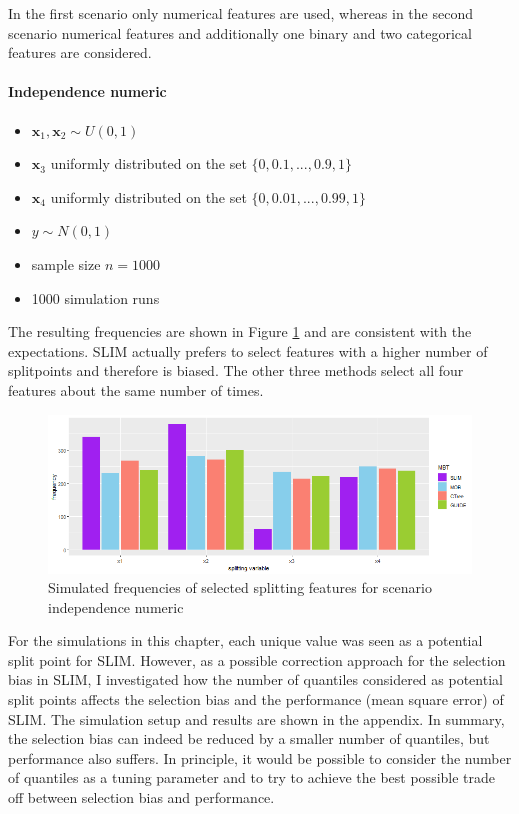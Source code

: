 In the first scenario only numerical features are used, whereas in the second scenario numerical features and additionally one binary and two categorical features are considered.

\paragraph{Independence numeric}
\begin{itemize}
    \item $\textbf{x}_{1}, \textbf{x}_{2} \sim U(0,1)$
    \item $\textbf{x}_3$ uniformly distributed on the set $\{0, 0.1,..., 0.9, 1\}$
    \item $\textbf{x}_4$ uniformly distributed on the set $\{0, 0.01,..., 0.99, 1\}$
    \item $y \sim N(0,1)$
    \item sample size $n = 1000$
    \item 1000 simulation runs
\end{itemize}

The resulting frequencies are shown in Figure \ref{fig:selection_bias_independence_numeric} and are consistent with the expectations. SLIM actually prefers to select features with a higher number of splitpoints and therefore is biased. The other three methods select all four features about the same number of times.

\begin{figure}[!htb]
    \centering
    \includegraphics[width=16cm]{Figures/simulations/batchtools/selection_bias_general/independence_numerical.png}
    \caption{Simulated frequencies of selected splitting features for scenario independence numeric}
    \label{fig:selection_bias_independence_numeric}
\end{figure}

For the simulations in this chapter, each unique value was seen as a potential split point for SLIM.
However, as a possible correction approach for the selection bias in SLIM, I investigated how the number of quantiles considered as potential split points affects the selection bias and the performance (mean square error) of SLIM. The simulation setup and results are shown in the appendix. In summary, the selection bias can indeed be reduced by a smaller number of quantiles, but performance also suffers. In principle, it would be possible to consider the number of quantiles as a tuning parameter and to try to achieve the best possible trade off between selection bias and performance. 



